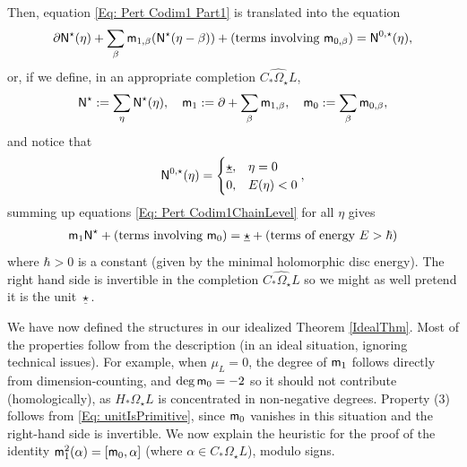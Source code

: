 \documentclass[10pt]{amsart}
\numberwithin{equation}{section}
\theoremstyle{plain}
\theoremstyle{definition}
\theoremstyle{remark}
\numberwithin{equation}{section}
\newcommand{\wh}[1]{\widehat{#1}}
\newcommand{\mm}{\textup{\textsf{m}}}
\newcommand{\NN}{\textup{\textsf{N}}}
\begin{document}
{Then, equation \eqref{Eq: Pert Codim1 Part1} is translated into the equation 
\begin{align}\label{Eq: Pert Codim1ChainLevel}
	\partial \NN^\star(\eta) + \sum_\beta \mm_{1,\beta} (\NN^\star(\eta -\beta)) +(\textup{terms involving }\mm_{0,\beta}) = \NN^{0,\star}(\eta),
\end{align}
or, if we define, in an appropriate completion $\wh{C_*\Omega_\star L}$,\begin{align*}
	\NN^\star:= \sum_\eta \NN^\star(\eta),\quad \mm_1:= \partial + \sum_\beta \mm_{1,\beta},\quad \mm_0:= \sum_\beta \mm_{0,\beta},
\end{align*} and notice that \begin{align*}
	\NN^{0,\star}(\eta)=\begin{cases}
		\underline{\star}, & \eta = 0\\
		0, & E(\eta)<0
	\end{cases},
\end{align*}
summing up equations \eqref{Eq: Pert Codim1ChainLevel} for all $\eta$ gives 
\begin{align}\label{Eq: unitIsPrimitive}
	\mm_1\NN^\star + (\textup{terms involving }\mm_0) = \underline{\star} + (\textup{terms of energy }E>\hbar)
\end{align}
where $\hbar>0$ is a constant (given by the minimal holomorphic disc energy).
The right hand side is invertible in the completion $\wh{C_*\Omega_\star L}$ so we might as  well pretend it is the unit $\underline{\star}$.

\bigskip
We have now defined the structures in our idealized Theorem \ref{IdealThm}. Most of the properties follow from the description (in an ideal situation, ignoring technical issues). For example, when $\mu_L=0$, the degree of $\mm_1$ follows directly from dimension-counting, and $\deg \mm_0 = -2$ so it should not contribute (homologically), as $H_*\Omega_\star L$ is concentrated in non-negative degrees. Property (3) follows from \eqref{Eq: unitIsPrimitive}, since $\mm_0$ vanishes in this situation and the right-hand side is invertible.
We now explain the heuristic for the proof of the identity $\mm_1^2(\alpha) = [\mm_0,\alpha]$ (where $\alpha \in C_*\Omega_\star L$), modulo signs.

}
\end{document}
